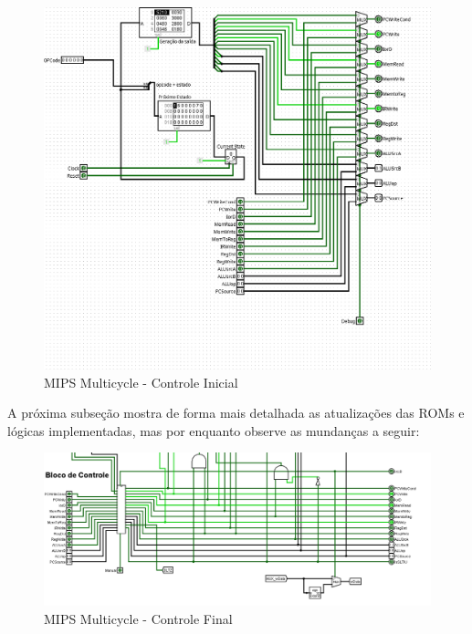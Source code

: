 \documentclass{report}
\begin{document}
        \begin{figure}[h!]
            \centering
            \includegraphics[width=\linewidth]{images/prints/Multicycle/Bloco de Controle Multicycle Antes.png}
            \caption{\label{print:Controle Inicial} MIPS Multicycle - Controle Inicial}
        \end{figure}

        \clearpage
        A próxima subseção mostra de forma mais detalhada as atualizações das ROMs e lógicas implementadas, mas por enquanto observe as mundanças a seguir:
        \begin{figure}[h!]
            \centering
            \includegraphics[width=\linewidth]{images/prints/Multicycle/Bloco de Controle Multicycle Depois.png}
            \caption{\label{print:Controle Final} MIPS Multicycle - Controle Final}
        \end{figure}
\end{document}
